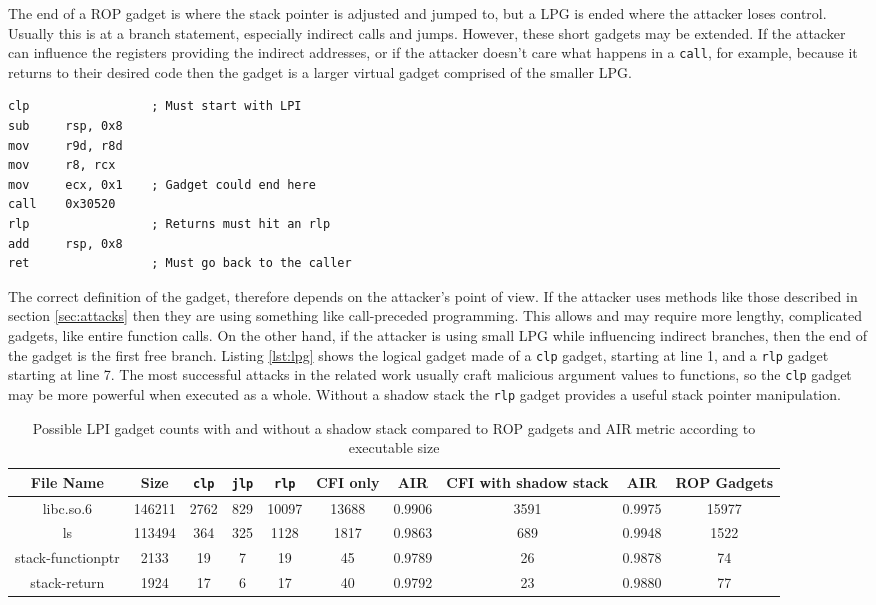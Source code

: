 \documentclass[conference,compsoc]{IEEEtran}
\begin{document}
The end of a ROP gadget is where the stack pointer is adjusted and jumped to, but a LPG is ended where the attacker loses control. Usually this is at a branch statement, especially indirect calls and jumps. However, these short gadgets may be extended. If the attacker can influence the registers providing the indirect addresses, or if the attacker doesn't care what happens in a \texttt{call}, for example, because it returns to their desired code then the gadget is a larger virtual gadget comprised of the smaller LPG\cite{NSAGitHub}.

\begin{lstlisting}[label=lst:lpg, caption=Example LPG\, call-preceded]
clp					; Must start with LPI
sub 	rsp, 0x8
mov 	r9d, r8d
mov 	r8, rcx
mov 	ecx, 0x1	; Gadget could end here
call 	0x30520
rlp					; Returns must hit an rlp
add 	rsp, 0x8
ret 				; Must go back to the caller
\end{lstlisting}

The correct definition of the gadget, therefore depends on the attacker's point of view. If the attacker uses methods like those described in section \ref{sec:attacks} then they are using something like call-preceded programming\cite{carlini2014rop}. This allows and may require more lengthy, complicated gadgets, like entire function calls. On the other hand, if the attacker is using small LPG while influencing indirect branches, then the end of the gadget is the first free branch. Listing \ref{lst:lpg} shows the logical gadget made of a \texttt{clp} gadget, starting at line 1, and a \texttt{rlp} gadget starting at line 7. The most successful attacks in the related work usually craft malicious argument values to functions, so the \texttt{clp} gadget may be more powerful when executed as a whole. Without a shadow stack the \texttt{rlp} gadget provides a useful stack pointer manipulation.

\begin{table*}[!ht]
\renewcommand{\arraystretch}{1.3}
\centering
\caption{Possible LPI gadget counts with and without a shadow stack compared to ROP gadgets and AIR metric according to executable size}
\label{tbl:lpicounts}
\begin{tabular}{|c|c|c|c|c|c|c|c|c|c|}
\hline
File Name & Size & \texttt{clp} & \texttt{jlp} & \texttt{rlp} & CFI only & AIR & CFI with shadow stack & AIR & ROP Gadgets\\
\hline
\hline
libc.so.6 & 146211 & 2762 & 829 & 10097 & 13688 & 0.9906 & 3591 & 0.9975 & 15977 \\
\hline
ls & 113494 & 364 & 325 & 1128 & 1817 & 0.9863 & 689 & 0.9948 & 1522\\
\hline
stack-functionptr & 2133 & 19 & 7 & 19 & 45 & 0.9789 & 26 & 0.9878 & 74\\
\hline
stack-return & 1924 & 17 & 6 & 17 & 40 & 0.9792 & 23 & 0.9880 & 77\\
\hline
\end{tabular}
\end{table*}
\end{document}
